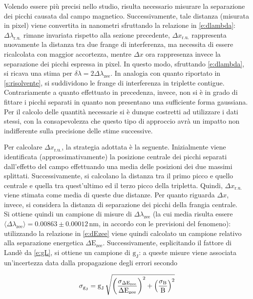 \documentclass[twocolumn,10pt]{asme2ej}
\begin{document}
\noindent Volendo essere più precisi nello studio, risulta necessario misurare la separazione dei picchi causata dal
campo magnetico. Successivamente, tale distanza (misurata in pixel) viene convertita in nanometri sfruttando la
relazione in \autoref{e:dlambda}: $\Delta\lambda_{\text{r.u.}}$ rimane invariata rispetto alla sezione precedente,
$\Delta x_{\text{r.u.}}$ rappresenta nuovamente la distanza tra due frange di interferenza, ma necessita di essere
ricalcolata con maggior accortezza, mentre $\Delta x$ ora rappresenza invece la separazione dei picchi espressa in
pixel. In questo modo, sfruttando \autoref{e:dlambda}, si ricava una stima per $\delta\lambda = 2
\Delta\lambda_{\text{zee}}$. In analogia con quanto riportato in \autoref{s:risolvente}, si suddividono le frange di
interferenza in triplette contigue. Contrariamente a quanto effettuato in precedenza, invece, non si è in grado di
fittare i picchi separati in quanto non presentano una sufficiente forma gaussiana. Per il calcolo delle quantità
necessarie si è dunque costretti ad utilizzare i dati stessi, con la consapevolezza che questo tipo di approccio avrà un
impatto non indifferente sulla precisione delle stime successive.

Per calcolare $\Delta x_{\text{r.u.}}$, la strategia adottata è la seguente. Inizialmente viene identificata
(approssimativamente) la posizione centrale dei picchi separati dall'effetto del campo effettuando una media delle
posizioni dei due massimi splittati. Successivamente, si calcolano la distanza tra il primo picco e quello centrale e
quella tra quest'ultimo ed il terzo picco della tripletta. Quindi, $\Delta x_{\text{r.u.}}$ viene stimata come media di
queste due distanze. Per quanto riguarda $\Delta x$, invece, si considera la distanza di separazione dei picchi della
frangia centrale. \\
Si ottiene quindi un campione di misure di $\Delta\lambda_{\text{zee}}$ (la cui media risulta essere
$\langle\Delta\lambda_{\text{zee}}\rangle = 0.00863 \pm 0.00012 \,\si{\nano\metre}$, in accordo con le previsioni del
fenomeno): utilizzando la relazione in \autoref{e:dEzee} viene quindi calcolato un campione relativo alla separazione
energetica $\Delta \text{E}_{\text{zee}}$. Successivamente, esplicitando il fattore di Landè da \autoref{e:gL}, si
ottiene un campione di $\text{g}_{\text{J}}$: a queste misure viene associata un'incertezza data dalla propagazione
degli errori secondo

\vspace{-15pt}
\begin{equation}
    \sigma_{\text{g}_{\text{J}}} = \text{g}_{\text{J}} \, 
    \sqrt{ 
        \left(\frac{\sigma_{\Delta \text{E}_{\text{zee}}}}{\Delta \text{E}_{\text{zee}}}\right)^2 + 
        \left(\frac{\sigma_{\text{B}}}{\text{B}}\right)^2
        }
    \vspace{-5pt}
\end{equation}
\end{document}
